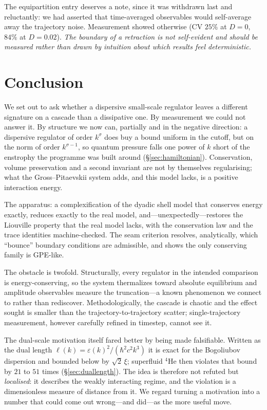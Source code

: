 \documentclass[11pt,a4paper]{article}
\theoremstyle{definition}
\theoremstyle{remark}
\begin{document}
The equipartition entry deserves a note, since it was withdrawn last and reluctantly: we
had asserted that time-averaged observables would self-average away the trajectory noise.
Measurement showed otherwise (CV $25\%$ at $D=0$, $84\%$ at $D=0.02$). \emph{The boundary
of a retraction is not self-evident and should be measured rather than drawn by intuition
about which results feel deterministic.}

\section{Conclusion}

We set out to ask whether a dispersive small-scale regulator leaves a different signature
on a cascade than a dissipative one. By measurement we could not answer it. By structure we
now can, partially and in the negative direction: a dispersive regulator of order $k^\sigma$
does buy a bound uniform in the cutoff, but on the norm of order $k^{\sigma-1}$, so quantum
pressure falls one power of $k$ short of the enstrophy the programme was built around
(\S\ref{sec:hamiltonian}). Conservation, volume preservation and a second invariant are not
by themselves regularising; what the Gross--Pitaevskii system adds, and this model lacks, is
a positive interaction energy.

The apparatus: a complexification of the dyadic shell model that conserves energy exactly,
reduces exactly to the real model, and---unexpectedly---restores the Liouville property
that the real model lacks, with the conservation law and the trace identities
machine-checked. The seam criterion resolves, analytically, which ``bounce'' boundary
conditions are admissible, and shows the only conserving family is GPE-like.

The obstacle is twofold. Structurally, every regulator in the intended comparison is
energy-conserving, so the system thermalizes toward absolute equilibrium and amplitude
observables measure the truncation---a known phenomenon we connect to rather than
rediscover. Methodologically, the cascade is chaotic and the effect sought is smaller than
the trajectory-to-trajectory scatter; single-trajectory measurement, however carefully
refined in timestep, cannot see it.

The dual-scale motivation itself fared better by being made falsifiable. Written as the
dual length $\ell(k) = \varepsilon(k)^2/(\hbar^2c^2k^3)$ it is exact for the Bogoliubov
dispersion and bounded below by $\sqrt2\,\xi$; superfluid $^4$He then violates that bound by
$21$ to $51$ times (\S\ref{sec:duallength}). The idea is therefore not refuted but
\emph{localised}: it describes the weakly interacting regime, and the violation is a
dimensionless measure of distance from it. We regard turning a motivation into a number that
could come out wrong---and did---as the more useful move.
\end{document}
